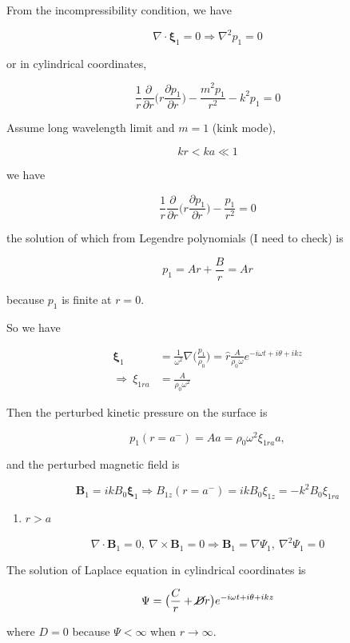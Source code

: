 \documentclass[
  notoc %
]{tufte-book}
\providecommand{\tightlist}{%
  \setlength{\itemsep}{0pt}\setlength{\parskip}{0pt}
}
\begin{document}
From the incompressibility condition, we have

\[
\nabla\cdot\pmb{\xi}_1=0\Rightarrow \nabla^2 p_1 =0
\]

or in cylindrical coordinates,

\[
\frac{1}{r}\frac{\partial}{\partial r}\big( r\frac{\partial p_1}{\partial r} \big) - \frac{m^2 p_1}{r^2} - k^2 p_1 = 0
\]

Assume long wavelength limit and \(m=1\) (kink mode),

\[
kr<ka\ll 1
\]

we have

\[
\frac{1}{r}\frac{\partial}{\partial r}\big( r\frac{\partial p_1}{\partial r} \big) - \frac{p_1}{r^2} = 0
\]

the solution of which from Legendre polynomials (I need to check) is

\[
p_1 = Ar + \frac{B}{r} = Ar
\]

because \(p_1\) is finite at \(r=0\).

So we have

\[
\begin{aligned}
\pmb{\xi}_1 &= \frac{1}{\omega^2}\nabla\big( \frac{p_1}{\rho_0} \big)=\hat{r}\frac{A}{\rho_0\omega}e^{-i\omega t +i\theta+ikz} \\
\Rightarrow\ \xi_{1ra} &= \frac{A}{\rho_0\omega^2}
\end{aligned}
\]

Then the perturbed kinetic pressure on the surface is

\[
p_1(r=a^-) = Aa = \rho_0 \omega^2 \xi_{1ra} a,
\]

and the perturbed magnetic field is

\[
\mathbf{B}_1=ikB_0\pmb{\xi}_1 \Rightarrow B_{1z}(r=a^-)=ikB_0 \xi_{1z}=-k^2 B_0\xi_{1ra}
\]

\begin{enumerate}
\def\labelenumi{(\Roman{enumi})}
\setcounter{enumi}{1}
\tightlist
\item
  \(r>a\)
\end{enumerate}

\[
\nabla\cdot\mathbf{B}_1=0,\ \nabla\times\mathbf{B}_1=0\Rightarrow \mathbf{B}_1 = \nabla\Psi_1,\ \nabla^2\Psi_1 = 0
\]

The solution of Laplace equation in cylindrical coordinates is

\[
\Psi = \big( \frac{C}{r}+\cancel{D}r\big)e^{-i\omega t+i\theta+ikz}
\]

where \(D=0\) because \(\Psi <\infty\) when \(r\rightarrow\infty\).
\end{document}
